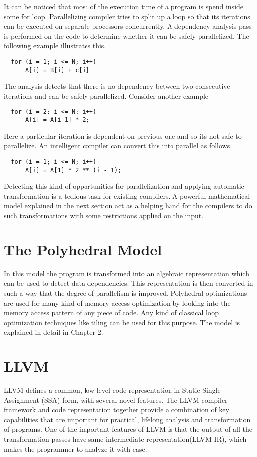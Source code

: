 \documentclass[a4paper,12pt]{book}
\begin{document}
It can be noticed that most of the execution time of a program is spend inside some
for loop. Parallelizing compiler tries to split up a loop so that its iterations can
be executed on separate processors concurrently. A dependency analysis pass is 
performed on the code to determine whether it can be safely parallelized. The following
example illustrates this.

{\footnotesize
\begin{lstlisting}
  for (i = 1; i <= N; i++)
      A[i] = B[i] + c[i]
\end{lstlisting}
}

The analysis detects that there is no dependency between two consecutive iterations and
can be safely parallelized. Consider another example

{\footnotesize
\begin{lstlisting}
  for (i = 2; i <= N; i++)
      A[i] = A[i-1] * 2;
\end{lstlisting}
}

Here a particular iteration is dependent on previous one and so its not safe to parallelize.
An intelligent compiler can convert this into parallel as follows.

{\footnotesize
\begin{lstlisting}
  for (i = 1; i <= N; i++)
      A[i] = A[1] * 2 ** (i - 1);
\end{lstlisting}
}

Detecting this kind of opportunities for parallelization and applying automatic transformation
is a tedious task for existing compilers. A powerful mathematical model explained in the next
section act as a helping hand for the compilers to do such transformations with some
restrictions applied on the input.

\section{The Polyhedral Model}

In this model the program is transformed into an algebraic representation which can be used to
detect data dependencies. This representation is then converted in such a way that the degree
of parallelism is improved. Polyhedral optimizations are used for many kind of memory access optimization by
looking into the memory access pattern of any piece of code. Any kind of classical
 loop optimization techniques like tiling can be used for this purpose. The model is
explained in detail in Chapter 2.

\section{LLVM}
LLVM defines a common, low-level code representation in Static Single Assignment
(SSA) form, with several novel features. The LLVM compiler framework and code
representation together provide a combination of key capabilities that are
important for practical, lifelong analysis and transformation of programs.
One of the important features of LLVM is that the output of all the
transformation passes have same intermediate representation(LLVM IR), which
makes the programmer to analyze it with ease.
\end{document}
